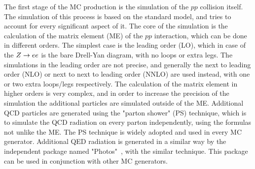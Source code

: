 The first stage of the MC production is the simulation of the $pp$ collision itself. The simulation of this process is based on the standard model, and tries to account for every significant aspect of it. The core of the simulation is the calculation of the matrix element (ME) of the $pp$ interaction, which can be done in different orders. The simplest case is the leading order (LO), which in case of the $Z \rightarrow ee$ is the bare Drell-Yan diagram, with no loops or extra legs. The simulations in the leading order are not precise, and generally the next to leading order (NLO) or next to next to leading order (NNLO) are used instead, with one or two extra loops/legs respectively. The calculation of the matrix element in higher orders is very complex, and in order to increase the precision of the simulation the additional particles are simulated outside of the ME. Additional QCD particles are generated using the "parton shower" (PS) technique, which is to simulate the QCD radiation on every parton independently, using the formulas not unlike the ME. The PS technique is widely adopted and used in every MC generator. Additional QED radiation is generated in a similar way by the independent package named "Photos"~\cite{lib:photos}, with the similar technique. This package can be used in conjunction with other MC generators.

